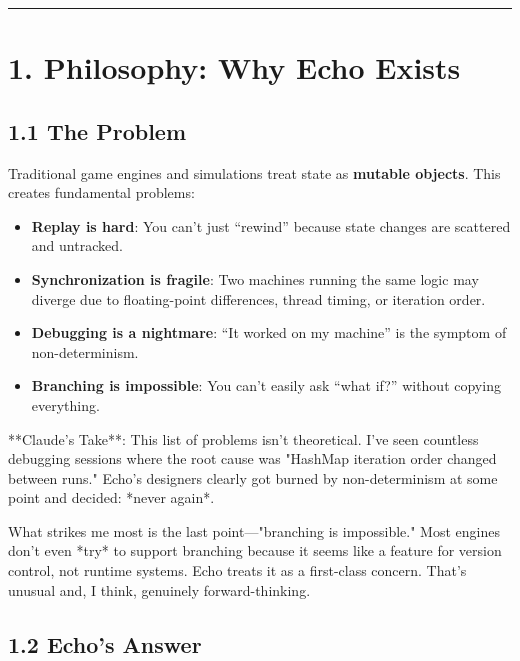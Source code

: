 \documentclass[
  11pt,
]{book}
\providecommand{\tightlist}{%
  \setlength{\itemsep}{0pt}\setlength{\parskip}{0pt}}
\begin{document}
\begin{center}\rule{0.5\linewidth}{0.5pt}\end{center}

\section{1. Philosophy: Why Echo
Exists}\label{philosophy-why-echo-exists}

\subsection{1.1 The Problem}\label{the-problem}

Traditional game engines and simulations treat state as \textbf{mutable
objects}. This creates fundamental problems:

\begin{itemize}
\tightlist
\item
  \textbf{Replay is hard}: You can't just ``rewind'' because state
  changes are scattered and untracked.
\item
  \textbf{Synchronization is fragile}: Two machines running the same
  logic may diverge due to floating-point differences, thread timing, or
  iteration order.
\item
  \textbf{Debugging is a nightmare}: ``It worked on my machine'' is the
  symptom of non-determinism.
\item
  \textbf{Branching is impossible}: You can't easily ask ``what if?''
  without copying everything.
\end{itemize}

\begin{claudecommentary}
**Claude's Take**: This list of problems isn't theoretical. I've seen countless debugging sessions where the root cause was "HashMap iteration order changed between runs." Echo's designers clearly got burned by non-determinism at some point and decided: *never again*.

What strikes me most is the last point—"branching is impossible." Most engines don't even *try* to support branching because it seems like a feature for version control, not runtime systems. Echo treats it as a first-class concern. That's unusual and, I think, genuinely forward-thinking.
\end{claudecommentary}

\subsection{1.2 Echo's Answer}\label{echos-answer}
\end{document}
